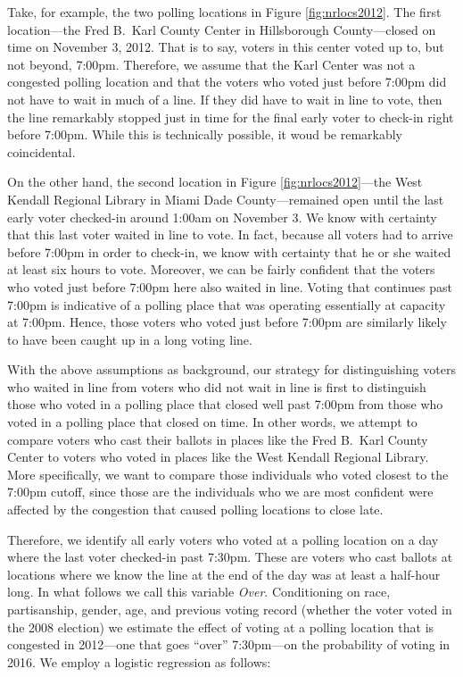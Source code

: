 \documentclass[12pt,titlepage]{article}
\begin{document}
Take, for example, the two polling locations in Figure
\ref{fig:nrlocs2012}.  The first location---the Fred B.\ Karl County
Center in Hillsborough County---closed on time on November 3,
2012. That is to say, voters in this center voted up to, but not
beyond, 7:00pm.  Therefore, we assume that the Karl Center was not a
congested polling location and that the voters who voted just before
7:00pm did not have to wait in much of a line.  If they did have to
wait in line to vote, then the line remarkably stopped just in time
for the final early voter to check-in right before 7:00pm.  While this
is technically possible, it woud be remarkably coincidental.

On the other hand, the second location in Figure
\ref{fig:nrlocs2012}---the West Kendall Regional Library in Miami Dade
County---remained open until the last early voter checked-in around
1:00am on November 3.  We know with certainty that this last voter
waited in line to vote.  In fact, because all voters had to arrive
before 7:00pm in order to check-in, we know with certainty that he or
she waited at least six hours to vote.  Moreover, we can be fairly
confident that the voters who voted just before 7:00pm here also
waited in line.  Voting that continues past 7:00pm is indicative of a
polling place that was operating essentially at capacity at 7:00pm.
Hence, those voters who voted just before 7:00pm are similarly likely
to have been caught up in a long voting line.

With the above assumptions as background, our strategy for
distinguishing voters who waited in line from voters who did not wait
in line is first to distinguish those who voted in a polling place
that closed well past 7:00pm from those who voted in a polling place
that closed on time.  In other words, we attempt to compare voters who
cast their ballots in places like the Fred B.\ Karl County Center to
voters who voted in places like the West Kendall Regional Library.
More specifically, we want to compare those individuals who voted
closest to the 7:00pm cutoff, since those are the individuals who we
are most confident were affected by the congestion that caused polling
locations to close late.
 
Therefore, we identify all early voters who voted at a polling
location on a day where the last voter checked-in past 7:30pm.  These
are voters who cast ballots at locations where we know the line at the
end of the day was at least a half-hour long.  In what follows we call
this variable \emph{Over}.  Conditioning on race, partisanship,
gender, age, and previous voting record (whether the voter voted in
the 2008 election) we estimate the effect of voting at a polling
location that is congested in 2012---one that goes ``over''
7:30pm---on the probability of voting in 2016.  We employ a logistic
regression as follows:
\end{document}
